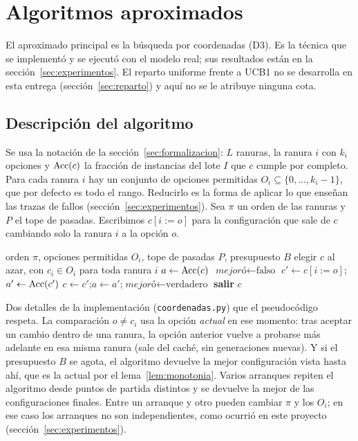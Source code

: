 \section{Algoritmos aproximados}
\label{sec:aproximados}

El aproximado principal es la búsqueda por coordenadas (D3). Es la técnica que se
implementó y se ejecutó con el modelo real; sus resultados están en la
sección~\ref{sec:experimentos}. El reparto uniforme frente a UCB1 no se desarrolla en esta
entrega (sección~\ref{sec:reparto}) y aquí no se le atribuye ninguna cota.

\subsection{Descripción del algoritmo}

Se usa la notación de la sección~\ref{sec:formalizacion}: $L$ ranuras, la ranura $i$ con
$k_i$ opciones y $\operatorname{Acc}(c)$ la fracción de instancias del lote $I$ que $c$ cumple por
completo. Para cada ranura $i$ hay un conjunto de opciones permitidas
$O_i\subseteq\{0,\dots,k_i-1\}$, que por defecto es todo el rango. Reducirlo es la forma de
aplicar lo que enseñan las trazas de fallos (sección~\ref{sec:experimentos}). Sea $\pi$ un
orden de las ranuras y $P$ el tope de pasadas. Escribimos $c[i{:=}o]$ para la configuración
que sale de $c$ cambiando solo la ranura $i$ a la opción $o$.

\begin{algorithm}[h]
\caption{Coordenadas con un arranque}
\label{alg:coordenadas}
\begin{algorithmic}[1]
\Require orden $\pi$, opciones permitidas $O_i$, tope de pasadas $P$, presupuesto $B$
\State elegir $c$ al azar, con $c_i\in O_i$ para toda ranura $i$ 
\State $a\gets\operatorname{Acc}(c)$
  \State $\textit{mejoró}\gets\text{falso}$
      \State $c'\gets c[i{:=}o]$;\quad $a'\gets\operatorname{Acc}(c')$
       
        \State $c\gets c'$;\quad $a\gets a'$;\quad $\textit{mejoró}\gets\text{verdadero}$
      \EndIf
    \EndFor
  \EndFor
   \State \textbf{salir}  \EndIf
\EndFor
\State \Return $c$
\end{algorithmic}
\end{algorithm}

Dos detalles de la implementación (\texttt{coordenadas.py}) que el pseudocódigo respeta. La
comparación $o\neq c_i$ usa la opción \emph{actual} en ese momento: tras aceptar un cambio
dentro de una ranura, la opción anterior vuelve a probarse más adelante en esa misma
ranura (sale del caché, sin generaciones nuevas). Y si el presupuesto $B$ se agota, el
algoritmo devuelve la mejor configuración vista hasta ahí, que es la actual por el
lema~\ref{lem:monotonia}. Varios arranques repiten el algoritmo desde puntos de partida
distintos y se devuelve la mejor de las configuraciones finales. Entre un arranque y otro
pueden cambiar $\pi$ y los $O_i$; en ese caso los arranques no son independientes, como
ocurrió en este proyecto (sección~\ref{sec:experimentos}).

